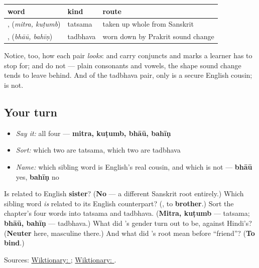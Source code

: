 \begin{grammarlens}[title={Grammar Lens: the chapter's whole shape, in two pairs}]
\noindent
\begin{tabularx}{\linewidth}{@{}>{\raggedright\arraybackslash}X>{\raggedright\arraybackslash}X>{\raggedright\arraybackslash}X@{}}
\toprule
\textbf{word} & \textbf{kind} & \textbf{route} \\
\midrule
\mr{मित्र}, \mr{कुटुंब} (\emph{mitra, kuṭumb}) & tatsama & taken up whole from Sanskrit \\
\mr{भाऊ}, \mr{बहीण} (\emph{bhāū, bahīṇ}) & tadbhava & worn down by Prakrit sound change \\
\bottomrule
\end{tabularx}

Notice, too, how each pair \emph{looks}: \textbf{} and \textbf{} carry conjuncts and marks a learner has to stop for; \textbf{} and \textbf{} do not — plain consonants and vowels, the shape sound change tends to leave behind. And of the tadbhava pair, only \textbf{} is a secure English cousin; \textbf{} is not.
\end{grammarlens}

\subsection*{Your turn}
\begin{itemize}
\raggedright
  \item \emph{Say it:} all four — \textbf{mitra, kuṭumb, bhāū, bahīṇ}
  \item \emph{Sort:} which two are tatsama, which two are tadbhava
  \item \emph{Name:} which sibling word is English's real cousin, and which is not — \textbf{bhāū} yes, \textbf{bahīṇ} no
\end{itemize}

\begin{tcolorbox}[breakable,colback=teal!4,colframe=teal!35!black,title={Before you move on}]
Is \textbf{} related to English \textbf{sister}? (\textbf{No} — a different Sanskrit root entirely.) Which sibling word \emph{is} related to its English counterpart? (\textbf{}, to \textbf{brother}.) Sort the chapter's four words into tatsama and tadbhava. (\textbf{Mitra, kuṭumb} — tatsama; \textbf{bhāū, bahīṇ} — tadbhava.) What did \textbf{}'s gender turn out to be, against Hindi's? (\textbf{Neuter} here, masculine there.) And what did \textbf{}'s root mean before \textquotedblleft{}friend\textquotedblright{}? (\textbf{To bind}.)

Sources: \href{https://en.wiktionary.org/wiki/\%E0\%A4\%AC\%E0\%A4\%B9\%E0\%A5\%80\%E0\%A4\%A3}{Wiktionary: }; \href{https://en.wiktionary.org/wiki/\%E0\%A4\%AD\%E0\%A4\%97\%E0\%A4\%BF\%E0\%A4\%A8\%E0\%A5\%80}{Wiktionary: }.
\end{tcolorbox}
